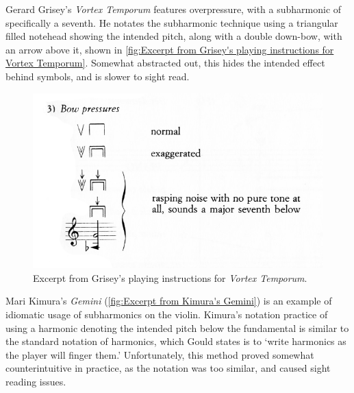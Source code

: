 


Gerard Grisey's \emph{Vortex Temporum} features overpressure, with a subharmonic of specifically a seventh.\autocite[]{griseyVortexTemporum}
He notates the subharmonic technique using a triangular filled notehead showing the intended pitch, along with a double down-bow, with an arrow above it, shown in \autoref{fig:Excerpt from Grisey's playing instructions for Vortex Temporum}. 
Somewhat abstracted out, this hides the intended effect behind symbols, and is slower to sight read.


\begin{figure}
\includegraphics[width=\linewidth]{./resources/griseyVortexTemporum.jpg}
\caption{Excerpt from Grisey's playing instructions for \emph{Vortex Temporum}.}\label{fig:Excerpt from Grisey's playing instructions for Vortex Temporum}\end{figure}


Mari Kimura's \emph{Gemini} (\autoref{fig:Excerpt from Kimura's Gemini}) is an example of idiomatic usage of subharmonics on the violin.\autocite[]{kimuraGemini1992}
Kimura's notation practice of using a harmonic denoting the intended pitch below the fundamental is similar to the standard notation of harmonics, which Gould states is to `write harmonics as the player will finger them.'\autocite[413]{gouldBars2011} 
Unfortunately, this method proved somewhat counterintuitive in practice, as the notation was too similar, and caused sight reading issues.\autocite[]{appleseedFeedbackExploratorySession2019}

